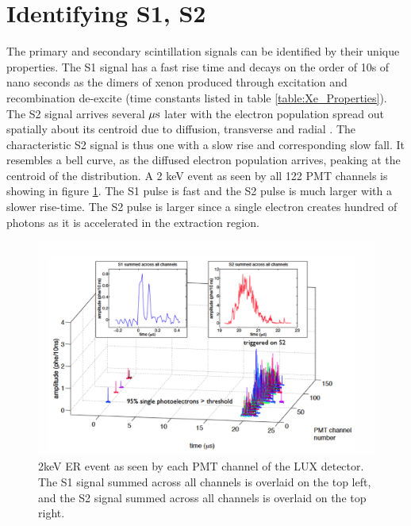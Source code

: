 \section{Identifying S1, S2}
The primary and secondary scintillation signals can be identified by their unique properties. The S1 signal has a fast rise time and decays on the order of 10s of nano seconds as the dimers of xenon produced through excitation and recombination de-excite (time constants listed in table \ref{table:Xe_Properties}). The S2 signal arrives several $\rm \mu s$ later with the electron population spread out spatially about its centroid due to diffusion, transverse and radial \cite{Electron_Diffusion}. The characteristic S2 signal is thus one with a slow rise and corresponding slow fall. It resembles a bell curve, as the diffused electron population arrives, peaking at the centroid of the distribution. A 2 keV event as seen by all 122 PMT channels is showing in figure \ref{fig:LUX_Golden}. The S1 pulse is fast and the S2 pulse is much larger with a slower rise-time.  The S2 pulse is larger since a single electron creates hundred of photons as it is accelerated in the extraction region. 


 \begin{figure}[h!]\centering
\includegraphics[width=130mm]{Chapter_LUX_Det/LUX_Golden_Event_2keV.png}
\caption{ 2keV ER event as seen by each PMT channel of the LUX detector. The S1 signal summed across all channels is overlaid on the top left, and the S2 signal summed across all channels is overlaid on the top right.}
\label{fig:LUX_Golden}
\end{figure}


